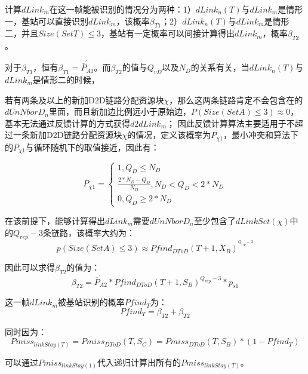 \documentclass[figurelist,tablelist,algorithmlist,nomlist,masters]{seuthesix}
\begin{document}
	计算$dLink_m$在这一帧能被识别的情况分为两种：1）$dLink_n(T)$与$dLink_m$是情形一，基站可以直接识别$dLink_m$，该概率$\beta _{T1}$；2）$dLink_n(T)$与$dLink_m$是情形二，并且$Size(SetT) \le 3$，基站有一定概率可以间接计算得出$dLink_m$，概率$\beta _{T2}$。
	
	对于$\beta _{T1}$，恒有$\beta _{T1} = \acute{\overline P _{A1}}$。而$\beta _{T2}$的值与$Q_{vD}$以及$N_D$的关系有关，当$dLink_n(T)$与$dLink_m$是情形二的时候，
	
	若有两条及以上的新加D2D链路分配资源块$\chi $，那么这两条链路肯定不会包含在的$dUnNborD_n$里面，而且新加边比例远小于原始边，$P(Size(SetA) \le 3) \approx 0$，基本无法通过反馈计算的方式获得$d2dLin{k_m}$；
	因此反馈计算算法主要适用于不超过一条新加D2D链路分配资源块$\chi $的情况，定义该概率为$P_{\chi 1}$，最小冲突和算法下的$P_{\chi 1}$与循环随机下的取值接近，因此有：
	
	\begin{equation}\label{eq3.1}
	P_{\chi 1} = \left\{ \begin{array}{l}
	1,Q_D \le N_D\\
	\frac{{2*N_D - Q_D}}{{N_D}},N_D < Q_D < 2*N_D\\
	0,Q_D \ge 2*N_D
	\end{array} \right.
	\end{equation}
	
	在该前提下，能够计算得出$dLink_m$需要$dUnNborD_n$至少包含了$dLinkSet(\chi )$中的$Q_{rep} - 3$条链路，该概率大约为：
	\begin{equation}\label{eq3.1}
	p(Size(SetA) \le 3) \approx Pfin{d_{DToD}}{(T + 1,X_B)^{^{Q_{rep} - 3}}}
	\end{equation}
	
	因此可以求得$\beta _{T2}$的值为：
	\begin{equation}\label{eq3.1}
	\beta _{T2} = \acute{\overline P _{A2}} * Pfin{d_{DToD}}{(T + 1,S_B)^{Q_{rep} - 3}}*{p_{s1}}
	\end{equation}
	
	这一帧$dLink_m$被基站识别的概率$Pfin{d_T}$为：
	\begin{equation}\label{eq3.1}
	Pfin{d_T} = \beta _{T2} + \beta _{T2}
	\end{equation}
	
	同时因为：
	\begin{equation}\label{eq3.1}
	Pmis{s_{linkStay(T)}} = Pmis{s_{DToD}}(T,S_C) = Pmis{s_{DToD}}(T,S_B)*(1 - Pfin{d_T})
	\end{equation}
	
	可以通过$Pmis{s_{linkStay(1)}}$代入递归计算出所有的$Pmis{s_{linkStay(T)}}$。
	
\end{document}
